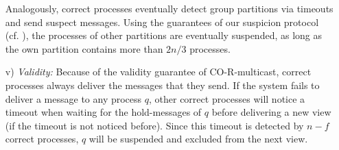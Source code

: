 \documentclass[runningheads]{llncs}
\begin{document}
\begin{enumerate}
    Analogously, correct processes eventually detect group partitions via timeouts and send suspect messages. Using the guarantees of our suspicion protocol (cf. ), the processes of other partitions are eventually suspended, as long as the own partition contains more than $2n/3$ processes. 
    \item[v)] \textit{Validity:} Because of the validity guarantee of CO-R-multicast, correct processes always deliver the messages that they send. If the system fails to deliver a message to any process $q$, other correct processes will notice a timeout when waiting for the hold-messages of $q$ before delivering a new view (if the timeout is not noticed before). Since this timeout is detected by $n-f$ correct processes, $q$ will be suspended and excluded from the next view. 
\end{enumerate}
\end{document}
